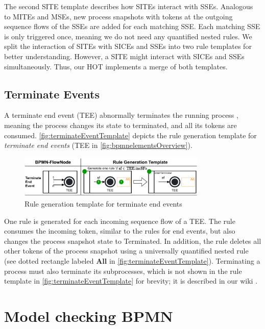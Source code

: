 \documentclass{lmcs} %
\begin{document}
The second SITE template describes how SITEs interact with SSEs.
Analogous to MITEs and MSEs, new process snapshots with tokens at the outgoing sequence flows of the SSEs are added for each matching SSE.
Each matching SSE is only triggered once, meaning we do not need any quantified nested rules.
We split the interaction of SITEs with SICEs and SSEs into two rule templates for better understanding.
However, a SITE might interact with SICEs and SSEs simultaneously.
Thus, our HOT implements a merge of both templates.

\subsection{Terminate Events}
A terminate end event (TEE) abnormally terminates the running process \cite{objectmanagementgroupBusinessProcessModel2013}, meaning the process changes its state to terminated, and all its tokens are consumed.
\autoref{fig:terminateEventTemplate} depicts the rule generation template for \textit{terminate end events} (\textsf{TEE} in \autoref{fig:bpmnelementsOverview}).

\begin{figure}[ht]
    \centering
    \includegraphics[width=0.8\textwidth]{images/terminate_end_event_template.pdf}
    \caption{Rule generation template for terminate end events}
    \label{fig:terminateEventTemplate}
\end{figure}

One rule is generated for each incoming sequence flow of a TEE.
The rule consumes the incoming token, similar to the rules for end events, but also changes the process snapshot state to \textsf{Terminated}.
In addition, the rule deletes all other tokens of the process snapshot using a universally quantified nested rule (see dotted rectangle labeled \textbf{All} in \autoref{fig:terminateEventTemplate}).
Terminating a process must also terminate its subprocesses, which is not shown in the rule template in \autoref{fig:terminateEventTemplate} for brevity; it is described in our wiki \cite{timkrauterLMCS2024Artifacts2023}.

\section{Model checking BPMN} \label{sec:modelChecking}
\end{document}
